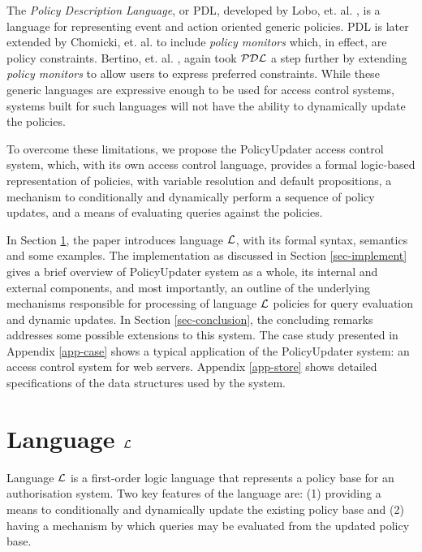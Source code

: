 \documentclass[11pt, twocolumn]{article}
\begin{document}
    The {\em Policy Description Language}, or {\cal PDL}, developed by Lobo,
    et. al. \cite{LOB}, is a language for representing event and action
    oriented generic policies. {\cal PDL} is later extended by Chomicki, et.
    al. \cite{CHO} to include {\em policy monitors} which, in effect, are
    policy constraints. Bertino, et. al. \cite{BE2}, again took ${\cal PDL}$ a
    step further by extending {\em policy monitors} to allow users to express
    preferred constraints. While these generic languages are expressive enough
    to be used for access control systems, systems built for such languages
    will not have the ability to dynamically update the policies.

    To overcome these limitations, we propose the PolicyUpdater access control
    system, which, with its own access control language, provides a formal
    logic-based representation of policies, with variable resolution and
    default propositions, a mechanism to conditionally and dynamically
    perform a sequence of policy updates, and a means of evaluating queries
    against the policies.

    In Section \ref{sec-langl}, the paper introduces language ${\cal L}$, with
    its formal syntax, semantics and some examples. The implementation as
    discussed in Section \ref{sec-implement} gives a brief overview of
    PolicyUpdater system as a whole, its internal and external components, and
    most importantly, an outline of the underlying mechanisms responsible for
    processing of language ${\cal L}$ policies for query evaluation and dynamic
    updates. In Section \ref{sec-conclusion}, the concluding remarks addresses
    some possible extensions to this system. The case study presented in
    Appendix \ref{app-case} shows a typical application of the PolicyUpdater
    system: an access control system for web servers. Appendix \ref{app-store}
    shows detailed specifications of the data structures used by the system.

  \section{Language $\cal{L}$}
    \label{sec-langl}

    Language $\cal{L}$ is a first-order logic language that represents a policy
    base for an authorisation system. Two key features of the language are: (1)
    providing a means to conditionally and dynamically update the existing
    policy base and (2) having a mechanism by which queries may be evaluated
    from the updated policy base.
\end{document}
